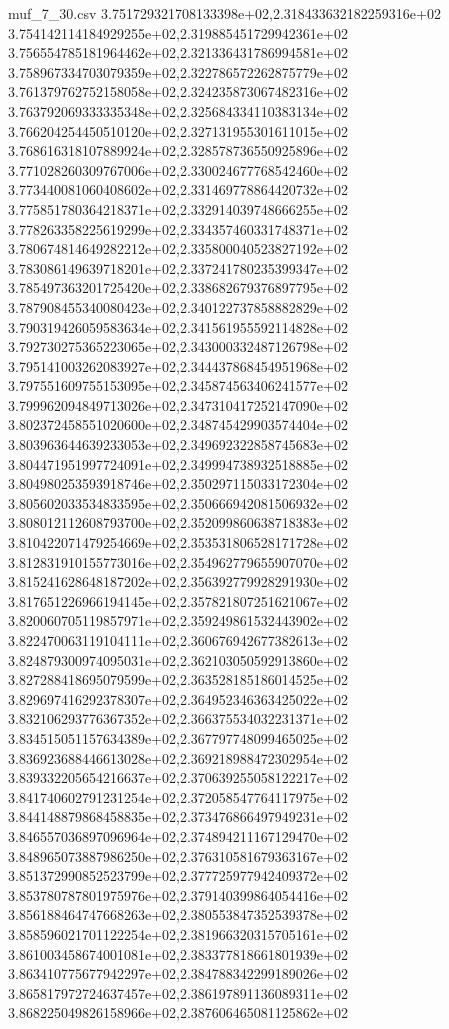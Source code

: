 \begin{filecontents*}{muf_7_30.csv}
3.751729321708133398e+02,2.318433632182259316e+02
3.754142114184929255e+02,2.319885451729942361e+02
3.756554785181964462e+02,2.321336431786994581e+02
3.758967334703079359e+02,2.322786572262875779e+02
3.761379762752158058e+02,2.324235873067482316e+02
3.763792069333335348e+02,2.325684334110383134e+02
3.766204254450510120e+02,2.327131955301611015e+02
3.768616318107889924e+02,2.328578736550925896e+02
3.771028260309767006e+02,2.330024677768542460e+02
3.773440081060408602e+02,2.331469778864420732e+02
3.775851780364218371e+02,2.332914039748666255e+02
3.778263358225619299e+02,2.334357460331748371e+02
3.780674814649282212e+02,2.335800040523827192e+02
3.783086149639718201e+02,2.337241780235399347e+02
3.785497363201725420e+02,2.338682679376897795e+02
3.787908455340080423e+02,2.340122737858882829e+02
3.790319426059583634e+02,2.341561955592114828e+02
3.792730275365223065e+02,2.343000332487126798e+02
3.795141003262083927e+02,2.344437868454951968e+02
3.797551609755153095e+02,2.345874563406241577e+02
3.799962094849713026e+02,2.347310417252147090e+02
3.802372458551020600e+02,2.348745429903574404e+02
3.803963644639233053e+02,2.349692322858745683e+02
3.804471951997724091e+02,2.349994738932518885e+02
3.804980253593918746e+02,2.350297115033172304e+02
3.805602033534833595e+02,2.350666942081506932e+02
3.808012112608793700e+02,2.352099860638718383e+02
3.810422071479254669e+02,2.353531806528171728e+02
3.812831910155773016e+02,2.354962779655907070e+02
3.815241628648187202e+02,2.356392779928291930e+02
3.817651226966194145e+02,2.357821807251621067e+02
3.820060705119857971e+02,2.359249861532443902e+02
3.822470063119104111e+02,2.360676942677382613e+02
3.824879300974095031e+02,2.362103050592913860e+02
3.827288418695079599e+02,2.363528185186014525e+02
3.829697416292378307e+02,2.364952346363425022e+02
3.832106293776367352e+02,2.366375534032231371e+02
3.834515051157634389e+02,2.367797748099465025e+02
3.836923688446613028e+02,2.369218988472302954e+02
3.839332205654216637e+02,2.370639255058122217e+02
3.841740602791231254e+02,2.372058547764117975e+02
3.844148879868458835e+02,2.373476866497949231e+02
3.846557036897096964e+02,2.374894211167129470e+02
3.848965073887986250e+02,2.376310581679363167e+02
3.851372990852523799e+02,2.377725977942409372e+02
3.853780787801975976e+02,2.379140399864054416e+02
3.856188464747668263e+02,2.380553847352539378e+02
3.858596021701122254e+02,2.381966320315705161e+02
3.861003458674001081e+02,2.383377818661801939e+02
3.863410775677942297e+02,2.384788342299189026e+02
3.865817972724637457e+02,2.386197891136089311e+02
3.868225049826158966e+02,2.387606465081125862e+02

\end{filecontents*}
